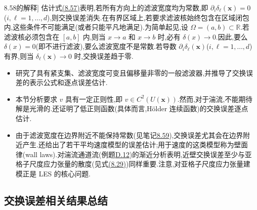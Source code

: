 \begin{note}[定理\hyperref[thm:box-filter-commutation-pointwise]{8.58}的解释]
\label{note:box-filter-commutation-interpretation}
估计式\hyperref[eq:box-filter-commutation-pointwise]{(8.57)}表明,若所有方向上的滤波宽度均为常数,即 $\partial_i\delta_\ell(\bm{x})=0$($i,\ell=1,\ldots,d$),则交换误差消失.在有界区域上,若要求滤波核始终包含在区域闭包内,这些条件不可能满足(或者只能平凡地满足).为简单起见,设 $\Omega=(a,b)\subset\mathbb{R}$.若滤波核必须包含在 $[a,b]$ 内,则当 $x\to a$ 和 $x\to b$ 时,必有 $\delta(x)\to0$.因此,要么 $\delta(x)=0$(即不进行滤波),要么滤波宽度不是常数.若导数 $\partial_i\delta_\ell(\bm{x})$($i,\ell=1,\ldots,d$)有界,则当 $\delta_\ell(\bm{x})\to0$ 时,交换误差趋于零.
\end{note}

\begin{note}
\label{note:compact-filter-commutation-results}
\begin{itemize}
 \item \parencite{BerselliGrisantiJohn2007}研究了具有紧支集、滤波宽度可变且偏移量非零的一般滤波器,并推导了交换误差的表示公式和逐点误差估计.
 \item 本节分析要求 $v$ 具有一定正则性,即 $v\in C^2(U(\bm{x}))$.然而,对于湍流,不能期待解是光滑的.\parencite{BerselliGrisantiJohn2007}还证明了低正则函数(具体而言,Hölder 连续函数)的交换误差逐点估计.
 \item 由于滤波宽度在边界附近不能保持常数(见笔记\hyperref[note:box-filter-commutation-interpretation]{8.59}),交换误差尤其会在边界附近产生.\parencite{BerselliGrisantiJohn2007}还给出了若干平均速度模型的误差估计;用于速度的这类模型称为壁面律(wall laws).\parencite{BerselliJohn2006}对湍流通道流(例题\hyperref[ex:appendix-d-12]{D.12})的渐近分析表明,近壁交换误差至少与亚格子尺度应力张量的散度(见式\hyperref[eq:subgrid-stress-decomposition]{(8.29)})同样重要.注意,对亚格子尺度应力张量建模正是 LES 的核心问题.
\end{itemize}
\end{note}

\subsection{交换误差相关结果总结}
\label{subsec:commutation-error-summary}

